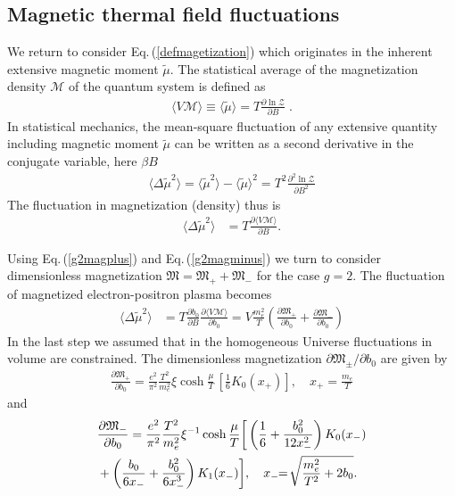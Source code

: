 \documentclass[aps,prd,floatfix,reprint]{revtex4-2}
\newcommand{\req}[1]{Eq.\,(\ref{#1})}
\begin{document}
{\subsection{Magnetic thermal field fluctuations}
\label{sec:fluc}
\noindent  We return to consider \req{defmagetization} which originates in the inherent extensive magnetic moment $\tilde\mu$. The statistical average of the magnetization density $\mathcal{M}$ of the quantum system is defined as
\begin{align}
\langle V \mathcal M\rangle\equiv \langle \tilde\mu\rangle = T\frac{\partial \ln\mathcal Z}{\partial B}\;.
\end{align}
In statistical mechanics, the mean-square fluctuation of any extensive quantity including magnetic moment $\tilde\mu$ can be written as a second derivative in the conjugate variable, here $\beta B$
\begin{align}
\langle\Delta \tilde\mu^2\rangle=\langle \tilde\mu^2\rangle-\langle \tilde\mu\rangle^2=T^2\frac{\partial^2 \ln\mathcal Z }{\partial B^2}
\end{align}
The fluctuation in magnetization (density) thus is
\begin{align}
\langle\Delta \tilde\mu^2\rangle&
=T\frac{\partial\langle V\mathcal{M}\rangle}{\partial B}.
\end{align}

Using  \req{g2magplus} and \req{g2magminus} we turn to consider dimensionless magnetization ${\mathfrak M}={\mathfrak M}_{+}+{\mathfrak M}_{-}$ for the case $g=2$. The fluctuation of magnetized electron-positron plasma becomes
\begin{align}\label{Fluctuation}
 \langle\Delta \tilde\mu^2\rangle&
 =T\frac{\partial b_0}{\partial B}\frac{\partial {\langle V\mathcal{M}\rangle} }{\partial b_0}
 =V\frac{m_e^2}{T}\left(\frac{\partial {\mathfrak M}_{+} }{\partial b_0}+\frac{\partial {\mathfrak M} _{-}}{\partial b_0}\right)
 \end{align}
 In the last step we assumed that in the homogeneous Universe fluctuations in volume are constrained. The dimensionless magnetization $\partial{\mathfrak M}_{\pm}/\partial b_0$ are given by
 \begin{align}
 \frac{\partial {\mathfrak M}_{+} }{\partial b_0}=\frac{e^{2}}{\pi^{2}}\frac{T^{2}}{m_{e}^{2}}\xi\cosh{\frac{\mu}{T}}\,\left[\frac{1}{6}K_{0}(x_{+})\right],\quad x_{+}=\frac{m_{e}}{T}
 \end{align}
 and 
 \begin{align}
  &\frac{\partial {\mathfrak M}_{-} }{\partial b_0}=\frac{e^{2}}{\pi^{2}}\frac{T^{2}}{m_{e}^{2}}\xi^{-1}\cosh{\frac{\mu}{T}}\bigg[\left(\frac{1}{6}+\frac{b^2_0}{12x^2_{-}}\right)K_0(x_{-})\notag\\
  &+\left(\frac{b_0}{6x_{-}}+\frac{b^2_0}{6x^3_{-}}\right)K_1(x_{-})\bigg],\quad  x_{-}\!\!=\!\sqrt{\frac{m_{e}^{2}}{T^{2}}+2b_{0}}.
 \end{align}
 
}
\end{document}
